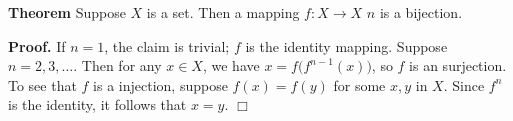 \documentclass[12pt]{article}
\begin{document}
 {\bf Theorem} Suppose $X$ is a set. 
 Then a mapping $f:X\to X$  $n$ is 
a bijection. 
 
 {\bf Proof.} If $n=1$, the claim is trivial;
 $f$ is the identity mapping.
Suppose $n=2,3,\ldots$.  
Then for any $x\in X$, we have $x=f\big(f^{n-1}(x)\big)$,
so $f$ is an surjection. To see that $f$ is a injection,
suppose $f(x)=f(y)$ for some $x,y$ in $X$. Since $f^n$
is the identity, it follows that $x=y$.  $\Box$
\end{document}
